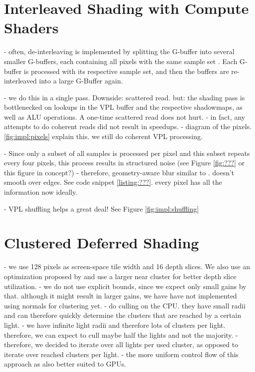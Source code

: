 
\section{Interleaved Shading with Compute Shaders}
\label{sec:impl:interleavedShading}
- often, de-interleaving is implemented by splitting the G-buffer into several smaller G-buffers, each containing all pixels with the same sample set \cite{segovia2006non}. Each G-buffer is processed with its respective sample set, and then the buffers are re-interleaved into a large G-Buffer again.


- we do this in a single pass. Downside: scattered read. but: the shading pass is bottlenecked on lookups in the VPL buffer and the respective shadowmaps, as well as ALU operations. A one-time scattered read does not hurt.
- in fact, any attempts to do coherent reads did not result in speedups.
- diagram of the pixels. \ref{fig:impl:pixels} explain this. we still do coherent VPL processing.


- Since only a subset of all samples is processed per pixel and this subset repeats every four pixels, this process results in structured noise (see Figure \ref{fig:???} or this figure in concept?)
- therefore, geometry-aware blur similar to \citet{laine2007incremental}. doesn't smooth over edges. See code snippet \ref{listing:???}. every pixel has all the information now ideally.

- VPL shuffling helps a great deal! See Figure \ref{fig:impl:shuffling}

\section{Clustered Deferred Shading}
\label{sec:impl:clusteredShading}

- we use 128 pixels as screen-space tile width and 16 depth slices. We also use an optimization proposed by \citet{???practical} and use a larger near cluster for better depth slice utilization.
- we do not use explicit bounds, since we expect only small gains by that. although it might result in larger gains, we have have not implemented using normals for clustering yet.
- \citet{???practical} do culling on the CPU. they have small radii and can therefore quickly determine the clusters that are reached by a certain light.
- we have infinite light radii and therefore lots of clusters per light. therefore, we can expect to cull maybe half the lights and not the majority.
- therefore, we decided to iterate over all lights per used cluster, as opposed to iterate over reached clusters per light.
- the more uniform control flow of this approach as also better suited to GPUs.

